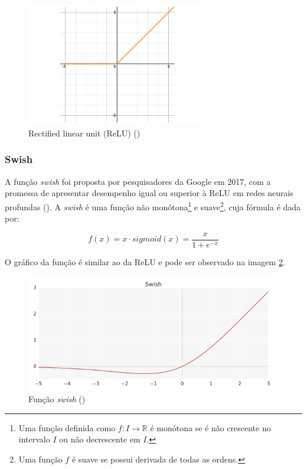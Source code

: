 \begin{figure}[H] 
  \includegraphics[width= 8cm]{../figuras/relu.png}
  \caption{Rectified linear unit (ReLU) (\cite{dl-oreilly})}
  \label{fig:relu}
\end{figure}

\subsubsection{Swish}

A função \textit{swish} foi proposta por pesquisadores da 
Google em 2017, com a promessa de apresentar desempenho igual 
ou superior à ReLU em redes neurais profundas (\cite{swish}). A \textit{swish} é uma função 
não monótona\footnote{Uma função definida como $f: I \rightarrow \mathbb{R}$
é monótona se é não crescente no intervalo $I$ ou não decrescente em $I$.} e 
suave\footnote{Uma função $f$ é suave se possui derivada de todas as ordens.},
cuja fórmula é dada por:

\begin{equation}
  f(x) = x \cdot sigmoid(x) = \frac{x}{1+e^{-x}}
\end{equation}


O gráfico da função é similar ao da ReLU e pode ser observado na imagem \ref{fig:swish}.

\begin{figure}[H] 
  \includegraphics[width= 12cm]{../figuras/swish.png}
  \caption{Função \textit{swish} (\cite{swish})}
  \label{fig:swish}
\end{figure}


